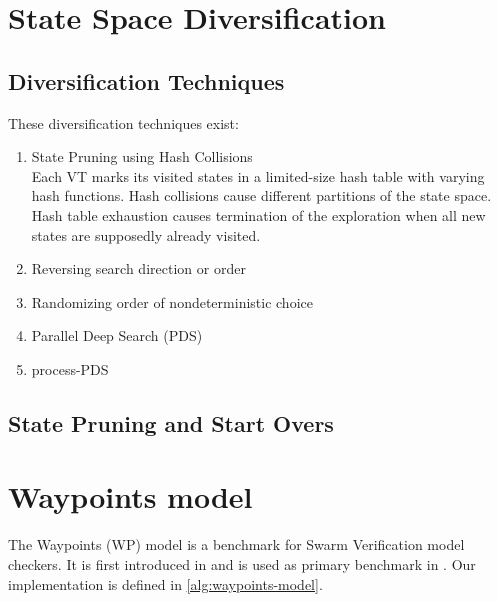 \documentclass[
fancyheadings, %
%
%
]{stsreprt}
\begin{document}
\section{State Space Diversification}
\label{section:theory:state-space-diversification}

\subsection{Diversification Techniques}

These diversification techniques exist:

\begin{enumerate}
    \item \textsf{State Pruning using Hash Collisions} \\ Each VT marks its visited states in a limited-size hash table with varying hash functions. Hash collisions cause different partitions of the state space. Hash table exhaustion causes termination of the exploration when all new states are supposedly already visited.
    \item \textsf{Reversing search direction or order}
    \item \textsf{Randomizing order of nondeterministic choice}
    \item \textsf{Parallel Deep Search (PDS)}
    \item \textsf{process-PDS}
\end{enumerate}

\subsection{State Pruning and Start Overs}
\label{section:theory:state-pruning}




\section{Waypoints model}
\label{section:theory:waypoints-model}

The Waypoints (WP) model is a benchmark for Swarm Verification model checkers.
It is first introduced in \cite{Holzmann2011.Swarm-Verification-Techniques} and is used as primary benchmark in \cite{DeFrancisco2020.Grapple}.
Our implementation is defined in \cref{alg:waypoints-model}.
\end{document}
